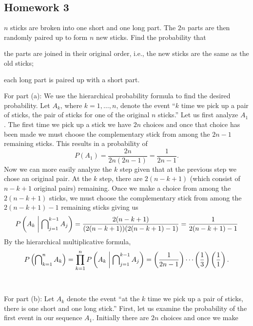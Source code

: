 \subsection{Homework 3}
\begin{problem}[Handout 3, \# 3]
  \(n\) sticks are broken into one short and one long part. The \(2n\)
  parts are then randomly paired up to form \(n\) new sticks. Find the
  probability that
  \begin{alphlist}
  \item the parts are joined in their original order, i.e., the new sticks
    are the same as the old sticks;
  \item each long part is paired up with a short part.
  \end{alphlist}
\end{problem}
\begin{solution*}
  For part (a): We use the hierarchical probability formula to find the
  desired probability. Let \(A_k\), where \(k=1,\dotsc,n\), denote the
  event ``\(k\) time we pick up a pair of sticks, the pair of
  sticks for one of the original \(n\) sticks.'' Let us first analyze
  \(A_1\). The first time we pick up a stick we have \(2n\) choices and
  once that choice has been made we must choose the complementary stick
  from among the \(2n-1\) remaining sticks. This results in a probability
  of
  \[
    P(A_1)=\frac{2n}{2n(2n-1)}=\frac{1}{2n-1}.
  \]
  Now we can more easily analyze the \(k\) step given that at
  the previous step we chose an original pair. At the \(k\)
  step, there are \(2(n-k+1)\) (which consist of \(n-k+1\) original pairs)
  remaining. Once we make a choice from among the \(2(n-k+1)\) sticks, we
  must choose the complementary stick from among the \(2(n-k+1)-1\)
  remaining sticks giving us
  \[
    P\left(A_k\relmiddle|\bigcap\nolimits_{j=1}^{k-1}A_j\right)=%
    \frac{2(n-k+1)}{(2(n-k+1))(2(n-k+1)-1)}=%
    \frac{1}{2(n-k+1)-1}
  \]
  By the hierarchical multiplicative formula,
  \[
    P\left(\bigcap\nolimits_{k=1}^n A_k\right)=%
    \prod_{k=1}^n P\left(A_k\relmiddle|\bigcap\nolimits_{j=1}^{k-1}A_j\right)=%
    \left(\frac{1}{2n-1}\right)%
    \dotsm%
    \left(\frac{1}{3}\right)\left(\frac{1}{1}\right).
  \]
  \\\\
  For part (b): Let \(A_k\) denote the event ``at the \(k\)
  time we pick up a pair of sticks, there is one short and one long
  stick.'' First, let us examine the probability of the first event in our
  sequence \(A_1\). Initially there are \(2n\) choices and once we make

\end{solution*}
